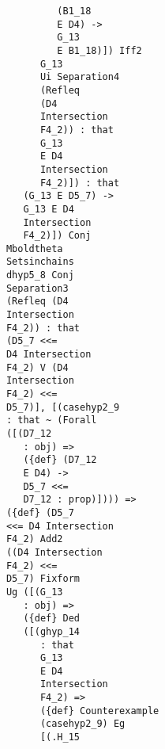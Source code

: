 \documentclass[12pt]{article}
\begin{document}
\begin{verbatim}
                                        (B1_18 
                                        E D4) -> 
                                        G_13 
                                        E B1_18)]) Iff2 
                                     G_13 
                                     Ui Separation4 
                                     (Refleq 
                                     (D4 
                                     Intersection 
                                     F4_2)) : that 
                                     G_13 
                                     E D4 
                                     Intersection 
                                     F4_2)]) : that 
                                  (G_13 E D5_7) -> 
                                  G_13 E D4 
                                  Intersection 
                                  F4_2)]) Conj 
                               Mboldtheta 
                               Setsinchains 
                               dhyp5_8 Conj 
                               Separation3 
                               (Refleq (D4 
                               Intersection 
                               F4_2)) : that 
                               (D5_7 <<= 
                               D4 Intersection 
                               F4_2) V (D4 
                               Intersection 
                               F4_2) <<= 
                               D5_7)], [(casehyp2_9 
                               : that ~ (Forall 
                               ([(D7_12 
                                  : obj) => 
                                  ({def} (D7_12 
                                  E D4) -> 
                                  D5_7 <<= 
                                  D7_12 : prop)]))) => 
                               ({def} (D5_7 
                               <<= D4 Intersection 
                               F4_2) Add2 
                               ((D4 Intersection 
                               F4_2) <<= 
                               D5_7) Fixform 
                               Ug ([(G_13 
                                  : obj) => 
                                  ({def} Ded 
                                  ([(ghyp_14 
                                     : that 
                                     G_13 
                                     E D4 
                                     Intersection 
                                     F4_2) => 
                                     ({def} Counterexample 
                                     (casehyp2_9) Eg 
                                     [(.H_15 

\end{verbatim}
\end{document}
